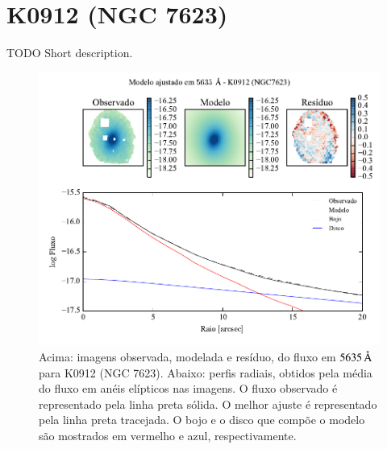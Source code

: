 
\section{K0912 (NGC 7623)}
\label{apendice:Decomp:K0912}

TODO Short description.

\begin{figure}
	\includegraphics[page=1]{figuras-decomp/K0912_sample006a}
	\caption[Ajuste morfológico em $5635\,\angstrom$ de K0912 (NGC 7623)]
	{Acima: imagens observada, modelada e resíduo, do fluxo em $5635\,\angstrom$
	para K0912 (NGC 7623). Abaixo: perfis radiais, obtidos pela média do fluxo em
	anéis elípticos nas imagens. O fluxo observado é representado pela linha preta
	sólida. O melhor ajuste é representado pela linha preta tracejada. O bojo e o
	disco que compõe o modelo são mostrados em vermelho e azul, respectivamente.}
	\label{fig:decompRadprof:K0912}
\end{figure}

